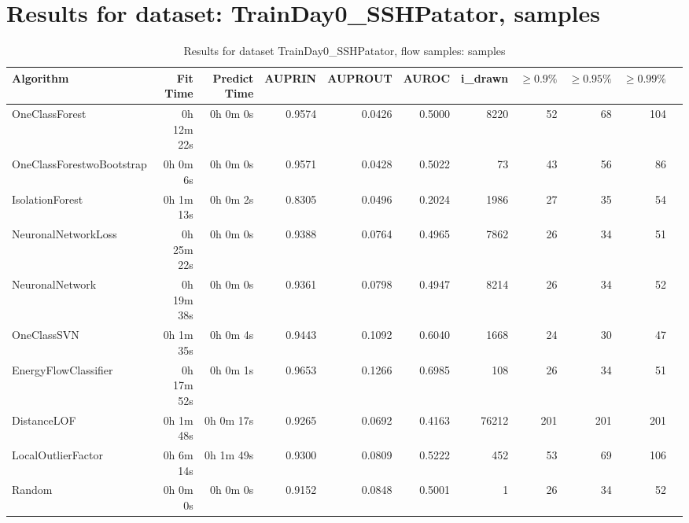 \documentclass{article}
\begin{document}
\section*{Results for dataset: TrainDay0_SSHPatator, samples}
\begin{table}[h!]
\centering
\caption{Results for dataset TrainDay0_SSHPatator, flow samples: samples}
\begin{tabular}{lrrrrrrrrrr}
\toprule
Algorithm & Fit Time & Predict Time & AUPRIN & AUPROUT & AUROC & i\_drawn & $\geq 0.9\%$ & $\geq 0.95\%$ & $\geq 0.99\%$ \\
\midrule
OneClassForest & 0h 12m 22s & 0h 0m 0s & 0.9574 & 0.0426 & 0.5000 & 8220 & 52 & 68 & 104 \\
OneClassForestwoBootstrap & 0h 0m 6s & 0h 0m 0s & 0.9571 & 0.0428 & 0.5022 & 73 & 43 & 56 & 86 \\
IsolationForest & 0h 1m 13s & 0h 0m 2s & 0.8305 & 0.0496 & 0.2024 & 1986 & 27 & 35 & 54 \\
NeuronalNetworkLoss & 0h 25m 22s & 0h 0m 0s & 0.9388 & 0.0764 & 0.4965 & 7862 & 26 & 34 & 51 \\
NeuronalNetwork & 0h 19m 38s & 0h 0m 0s & 0.9361 & 0.0798 & 0.4947 & 8214 & 26 & 34 & 52 \\
OneClassSVN & 0h 1m 35s & 0h 0m 4s & 0.9443 & 0.1092 & 0.6040 & 1668 & 24 & 30 & 47 \\
EnergyFlowClassifier & 0h 17m 52s & 0h 0m 1s & 0.9653 & 0.1266 & 0.6985 & 108 & 26 & 34 & 51 \\
DistanceLOF & 0h 1m 48s & 0h 0m 17s & 0.9265 & 0.0692 & 0.4163 & 76212 & 201 & 201 & 201 \\
LocalOutlierFactor & 0h 6m 14s & 0h 1m 49s & 0.9300 & 0.0809 & 0.5222 & 452 & 53 & 69 & 106 \\
Random & 0h 0m 0s & 0h 0m 0s & 0.9152 & 0.0848 & 0.5001 & 1 & 26 & 34 & 52 \\
\bottomrule
\end{tabular}
\end{table}
\end{document}
